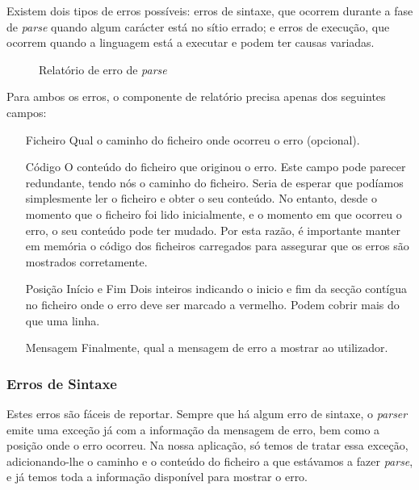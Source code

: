 Existem dois tipos de erros possíveis: erros de sintaxe, que ocorrem durante a fase de \textit{parse} quando algum carácter está no sítio errado; e erros de execução, que ocorrem quando a linguagem está a executar e podem ter causas variadas.

\begin{figure}[ht]
  \centering
  {%
  \setlength{\fboxsep}{0pt}%
  \setlength{\fboxrule}{0pt}%
  }%
  \caption{Relatório de erro de \textit{parse}}
  \label{fig:error_reporting_parse}
\end{figure}

Para ambos os erros, o componente de relatório precisa apenas dos seguintes campos:
\begin{enumerate}
 \item[Ficheiro] Qual o caminho do ficheiro onde ocorreu o erro (opcional).
 \item[Código] O conteúdo do ficheiro que originou o erro. Este campo pode parecer redundante, tendo nós o caminho do ficheiro. Seria de esperar que podíamos simplesmente ler o ficheiro e obter o seu conteúdo. No entanto, desde o momento que o ficheiro foi lido inicialmente, e o momento em que ocorreu o erro, o seu conteúdo pode ter mudado. Por esta razão, é importante manter em memória o código dos ficheiros carregados para assegurar que os erros são mostrados corretamente.
 \item[Posição Início e Fim] Dois inteiros indicando o inicio e fim da secção contígua no ficheiro onde o erro deve ser marcado a vermelho. Podem cobrir mais do que uma linha.
 \item[Mensagem] Finalmente, qual a mensagem de erro a mostrar ao utilizador.
\end{enumerate}

\subsubsection*{Erros de Sintaxe}
Estes erros são fáceis de reportar. Sempre que há algum erro de sintaxe, o \textit{parser} emite uma exceção já com a informação da mensagem de erro, bem como a posição onde o erro ocorreu. Na nossa aplicação, só temos de tratar essa exceção, adicionando-lhe o caminho e o conteúdo do ficheiro a que estávamos a fazer \textit{parse}, e já temos toda a informação disponível para mostrar o erro.

